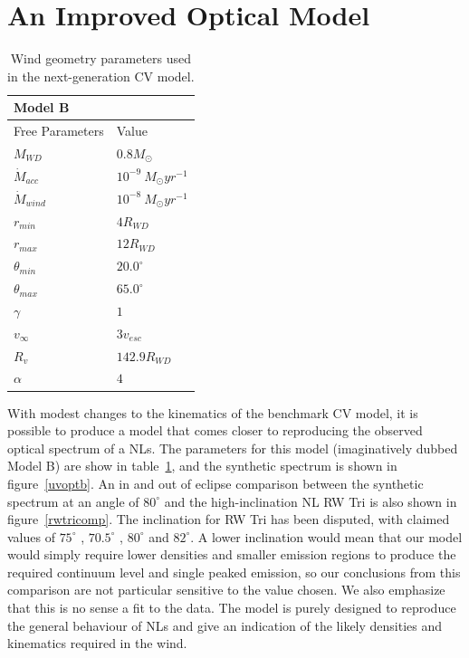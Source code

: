 \documentclass[preprint, a4paper, 11pt]{aastex}
\begin{document}
%
%

\section{An Improved Optical Model }

\begin{table}
\centering
\begin{tabular}{p{3cm}p{4cm}}
Model B \\
\hline Free Parameters 	&	 Value \\ 
\hline \hline 
$M_{WD}$ 	 &	 $0.8 M_{\odot}$ \\ 
$\dot{M}_{acc}$ 	 &	 $10^{-9}~M_{\odot}yr^{-1}$\\ 
$\dot{M}_{wind}$  &	$10^{-8}~M_{\odot}yr^{-1}$\\ 
$r_{min}$ 	&	 $4 R_{WD}$\\ 
$r_{max}$ 	&	 $12 R_{WD}$ \\ 
$\theta_{min}$ 	&	 $20.0^{\circ}$ \\ 
$\theta_{max}$ 	&	 $65.0^{\circ}$ \\ 
$\gamma$ 	&	 $1$ \\ 
$v_{\infty}$ 	&	 $3v_{esc}$ \\ 
$R_v$ 	        &	 $142.9 R_{WD}$ \\ 
$\alpha$ 	&	 $4$ \\
\end{tabular}
\centering
\caption{Wind geometry parameters used in the next-generation CV model.}
\label{modelb}
\end{table}

With modest changes to the kinematics of the benchmark CV model,
it is possible to produce a model
that comes closer to reproducing the observed optical spectrum
of a NLs. The parameters for this model (imaginatively dubbed Model B)
are show in table~\ref{modelb}, and the synthetic spectrum
is shown in figure~\ref{uvoptb}. An in and out of eclipse comparison 
between the synthetic spectrum
at an angle of $80^\circ$ and the high-inclination NL RW Tri 
is also shown in figure~\ref{rwtricomp}. The inclination
for RW Tri has been disputed, with claimed values of $75^\circ$ \citep{groot2004},
$70.5^\circ$ \citep{smak1995}, $80^\circ$ \citep{longmore1981} and 
$82^\circ$\citep{frankking1981}. A lower inclination
would mean that our model would simply require lower densities 
and smaller emission regions to produce the required continuum level
and single peaked emission, so our conclusions from this comparison are
not particular sensitive to the value chosen.
We also emphasize that this is no sense a fit to the data. The model
is purely designed to reproduce the general behaviour of NLs
and give an indication of the likely densities and kinematics 
required in the wind.
\end{document}

